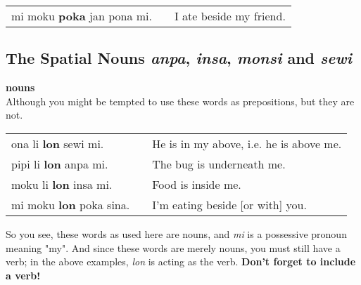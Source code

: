 \begin{supertabular}{p{5,5cm}|ll}
mi moku \textbf{poka} jan pona mi. && I ate beside my friend. \\
\end{supertabular} 
%   
%
%
%
%
\newpage
{}
\subsection*{The Spatial Nouns \textit{anpa}, \textit{insa}, \textit{monsi} and \textit{sewi}}
%
\textbf{nouns} \\
Although you might be tempted to use these words as prepositions, but they are not. 

\begin{supertabular}{p{5,5cm}|ll}
ona li \textbf{lon} sewi mi.    &&  He is in my above, i.e. he is above me. \\
pipi li \textbf{lon} anpa mi.   &&  The bug is underneath me. \\
moku li \textbf{lon} insa mi.   &&  Food is inside me. \\
mi moku \textbf{lon} poka sina. &&  I'm eating beside [or with] you. \\
\end{supertabular} 

So you see, these words as used here are nouns, and \textit{mi} is a possessive pronoun meaning "my". 
And since these words are merely nouns, you must still have a verb; in the above examples, \textit{lon} is acting as the verb. 
\textbf{Don't forget to include a verb!} 

